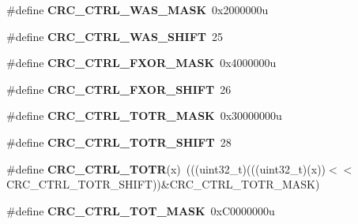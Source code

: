 \begin{DoxyCompactItemize}
\item 
\#define {\bfseries C\+R\+C\+\_\+\+C\+T\+R\+L\+\_\+\+W\+A\+S\+\_\+\+M\+A\+SK}~0x2000000u\hypertarget{group__CRC__Register__Masks_gaf3955c626d1b33289184fdc8a8a09147}{}\label{group__CRC__Register__Masks_gaf3955c626d1b33289184fdc8a8a09147}

\item 
\#define {\bfseries C\+R\+C\+\_\+\+C\+T\+R\+L\+\_\+\+W\+A\+S\+\_\+\+S\+H\+I\+FT}~25\hypertarget{group__CRC__Register__Masks_gaf0d0849f057da668b51b759b7a2ba70f}{}\label{group__CRC__Register__Masks_gaf0d0849f057da668b51b759b7a2ba70f}

\item 
\#define {\bfseries C\+R\+C\+\_\+\+C\+T\+R\+L\+\_\+\+F\+X\+O\+R\+\_\+\+M\+A\+SK}~0x4000000u\hypertarget{group__CRC__Register__Masks_ga7c59a3459d15bbbf8ae8bbcc208a1b31}{}\label{group__CRC__Register__Masks_ga7c59a3459d15bbbf8ae8bbcc208a1b31}

\item 
\#define {\bfseries C\+R\+C\+\_\+\+C\+T\+R\+L\+\_\+\+F\+X\+O\+R\+\_\+\+S\+H\+I\+FT}~26\hypertarget{group__CRC__Register__Masks_ga99bb491c03e22125b5053167bf361218}{}\label{group__CRC__Register__Masks_ga99bb491c03e22125b5053167bf361218}

\item 
\#define {\bfseries C\+R\+C\+\_\+\+C\+T\+R\+L\+\_\+\+T\+O\+T\+R\+\_\+\+M\+A\+SK}~0x30000000u\hypertarget{group__CRC__Register__Masks_ga1af35cbb29862b18aee64fd4f32bca07}{}\label{group__CRC__Register__Masks_ga1af35cbb29862b18aee64fd4f32bca07}

\item 
\#define {\bfseries C\+R\+C\+\_\+\+C\+T\+R\+L\+\_\+\+T\+O\+T\+R\+\_\+\+S\+H\+I\+FT}~28\hypertarget{group__CRC__Register__Masks_gab309d177a917d972212c78481cf25d4d}{}\label{group__CRC__Register__Masks_gab309d177a917d972212c78481cf25d4d}

\item 
\#define {\bfseries C\+R\+C\+\_\+\+C\+T\+R\+L\+\_\+\+T\+O\+TR}(x)~(((uint32\+\_\+t)(((uint32\+\_\+t)(x))$<$$<$C\+R\+C\+\_\+\+C\+T\+R\+L\+\_\+\+T\+O\+T\+R\+\_\+\+S\+H\+I\+FT))\&C\+R\+C\+\_\+\+C\+T\+R\+L\+\_\+\+T\+O\+T\+R\+\_\+\+M\+A\+SK)\hypertarget{group__CRC__Register__Masks_gad671df568418549570b651209067dcc3}{}\label{group__CRC__Register__Masks_gad671df568418549570b651209067dcc3}

\item 
\#define {\bfseries C\+R\+C\+\_\+\+C\+T\+R\+L\+\_\+\+T\+O\+T\+\_\+\+M\+A\+SK}~0x\+C0000000u\hypertarget{group__CRC__Register__Masks_ga66da08ca8e22cd72c74e4b3cf53df7dd}{}\label{group__CRC__Register__Masks_ga66da08ca8e22cd72c74e4b3cf53df7dd}


\end{DoxyCompactItemize}
